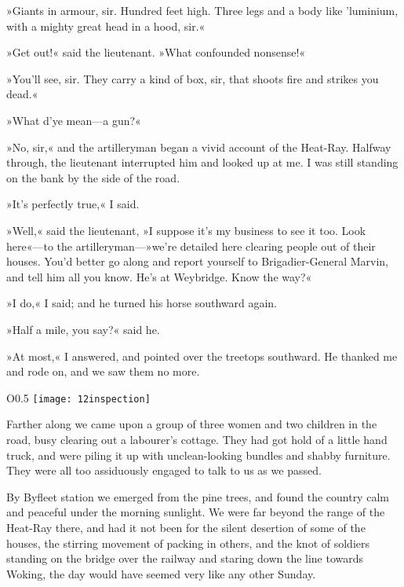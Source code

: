 »Giants in armour, sir. Hundred feet high. Three legs and a body like 'luminium, with a mighty great head in a hood, sir.«

»Get out!« said the lieutenant. »What confounded nonsense!«

»You'll see, sir. They carry a kind of box, sir, that shoots fire and strikes you dead.«

»What d'ye mean—a gun?«

»No, sir,« and the artilleryman began a vivid account of the Heat-Ray. Halfway through, the lieutenant interrupted him and looked up at me. I was still standing on the bank by the side of the road.

»It's perfectly true,« I said.

»Well,« said the lieutenant, »I suppose it's my business to see it too. Look here«—to the artilleryman—»we're detailed here clearing people out of their houses. You'd better go along and report yourself to Brigadier-General Marvin, and tell him all you know. He's at Weybridge. Know the way?«

»I do,« I said; and he turned his horse southward again.

»Half a mile, you say?« said he.

»At most,« I answered, and pointed over the treetops southward. He thanked me and rode on, and we saw them no more.

\begin{a4}
	\begin{wrapfigure}{O}{0.5\textwidth}
		\centering
		\texttt{[image: 12inspection]}
	\end{wrapfigure}
\end{a4}

Farther along we came upon a group of three women and two children in the road, busy clearing out a labourer's cottage. They had got hold of a little hand truck, and were piling it up with unclean-looking bundles and shabby furniture. They were all too assiduously engaged to talk to us as we passed.

By Byfleet station we emerged from the pine trees, and found the country calm and peaceful under the morning sunlight. We were far beyond the range of the Heat-Ray there, and had it not been for the silent desertion of some of the houses, the stirring movement of packing in others, and the knot of soldiers standing on the bridge over the railway and staring down the line towards Woking, the day would have seemed very like any other Sunday.

